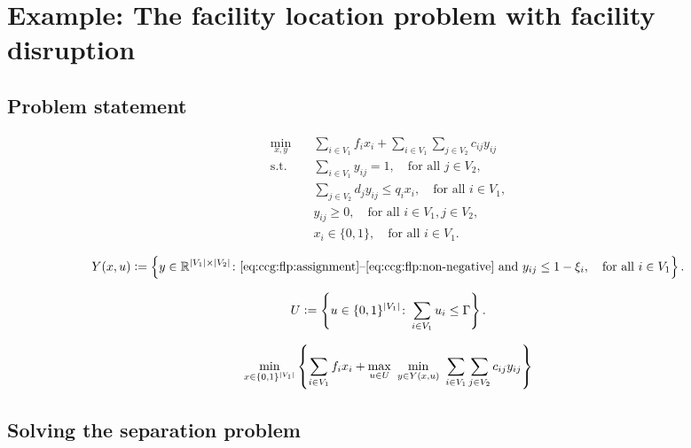 \section{Example: The facility location problem with facility disruption}

\subsection{Problem statement}

\begin{subequations}
    \begin{align}
        \min_{x,y} \quad & \sum_{i\in V_1} f_ix_i + \sum_{i\in V_1} \sum_{j\in V_2} c_{ij} y_{ij} \\
        \text{s.t.} \quad & \sum_{i\in V_1} y_{ij} = 1, \quad \text{for all } j\in V_2, \label{eq:ccg:flp:assignment} \\
        & \sum_{j\in V_2} d_jy_{ij} \le q_ix_i, \quad \text{for all } i\in V_1, \label{eq:ccg:flp:capacity} \\
        & y_{ij} \ge 0, \quad \text{for all } i\in V_1, j\in V_2, \label{eq:ccg:flp:non-negative} \\
        & x_i\in\{0,1\}, \quad \text{for all } i\in V_1.
    \end{align}
\end{subequations}

$$Y(x,u) \mathrel{{\mathop:}{=}} \left\{ y\in\mathbb{R}^{|V_1|\times|V_2|} \colon
\text{\eqref{eq:ccg:flp:assignment}--\eqref{eq:ccg:flp:non-negative} and }
y_{ij} \le 1 - \xi_i, \quad \text{for all }i\in V_1 \right\}.$$

$$U \mathrel{{\mathop:}{=}} \left\{ u\in\{0,1\}^{|V_1|} \colon \sum_{i\in V_1} u_i \le \Gamma \right\}.$$

\begin{equation*}
    \min_{x\in\{0,1\}^{|V_1|}} \Set{
        \sum_{i\in V_1} f_ix_i +
        \max_{u\in U} \ 
        \min_{ y\in Y(x,u) } \ 
        \sum_{i\in V_1} \sum_{j\in V_2} c_{ij} y_{ij}
    }
\end{equation*}

\subsection{Solving the separation problem}

